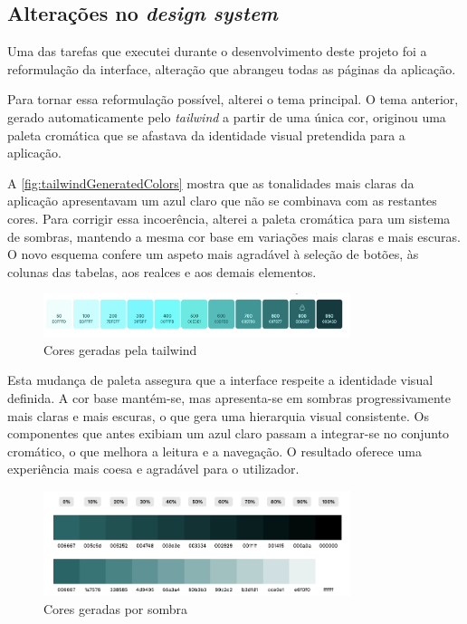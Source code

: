 \clearpage 
\subsection{Alterações no \textit{design system}} %
Uma das tarefas que executei durante o desenvolvimento deste projeto foi a reformulação da interface, alteração que abrangeu todas as páginas da aplicação.

Para tornar essa reformulação possível, alterei o tema principal. O tema anterior, gerado automaticamente pelo \textit{tailwind} a partir de uma única cor, originou uma paleta cromática que se afastava da identidade visual pretendida para a aplicação.

A \autoref{fig:tailwindGeneratedColors} mostra que as tonalidades mais claras da aplicação apresentavam um azul claro que não se combinava com as restantes cores. Para corrigir essa incoerência, alterei a paleta cromática para um sistema de sombras, mantendo a mesma cor base em variações mais claras e mais escuras. O novo esquema confere um aspeto mais agradável à seleção de botões, às colunas das tabelas, aos realces e aos demais elementos.

\begin{figure}[h!]
    \centering
    \includegraphics[width=0.8\textwidth]{figs/tailwindGeneratedColors.png}
    \caption{Cores geradas pela tailwind}
    \label{fig:tailwindGeneratedColors}
\end{figure}

Esta mudança de paleta assegura que a interface respeite a identidade visual definida. A cor base mantém-se, mas apresenta-se em sombras progressivamente mais claras e mais escuras, o que gera uma hierarquia visual consistente. Os componentes que antes exibiam um azul claro passam a integrar-se no conjunto cromático, o que melhora a leitura e a navegação. O resultado oferece uma experiência mais coesa e agradável para o utilizador.

\begin{figure}[h!]
    \centering
    \includegraphics[width=0.8\textwidth]{figs/shades.png}
    \caption{Cores geradas por sombra}
    \label{fig:shadesColors}
\end{figure}

